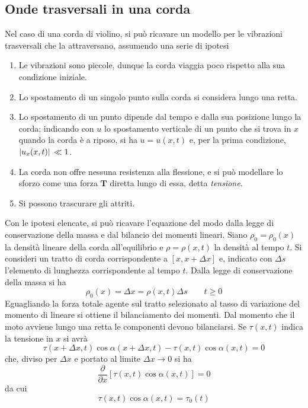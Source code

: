 \documentclass[a4paper,12pt, draft]{article}
\theoremstyle{break}
\numberwithin{equation}{section}
\begin{document}
\subsection{Onde trasversali in una corda}
Nel caso di una corda di violino, si può ricavare un modello per le vibrazioni trasversali che la attraversano, assumendo una serie di ipotesi
\begin{enumerate}
  \item Le vibrazioni sono piccole, dunque la corda viaggia poco rispetto alla sua condizione iniziale.
  \item Lo spostamento di un singolo punto sulla corda si considera lungo una retta.
  \item Lo spostamento di un punto dipende dal tempo e dalla sua posizione lungo la corda; indicando con \(u\) lo spostamento verticale di un punto che si trova in \(x\) quando la corda è a riposo, si ha \(u = u(x,t)\) e, per la prima condizione, \(\abs*{u_x(x,t)} \ll 1\).
  \item La corda non offre nessuna resistenza alla flessione, e si può modellare lo sforzo come una forza \(\bm{T}\) diretta lungo di essa, detta \emph{tensione}.
  \item Si possono trascurare gli attriti.
\end{enumerate}
Con le ipotesi elencate, si può ricavare l'equazione del modo dalla legge di conservazione della massa e dal bilancio dei momenti lineari. Siano \(\rho_0 = \rho_0(x)\) la densità lineare della corda all'equilibrio e \(\rho = \rho(x,t)\) la densità al tempo \(t\). Si consideri un tratto di corda corrispondente a \([x, x+\Delta x]\) e, indicato con \(\Delta s\) l'elemento di lunghezza corrispondente al tempo \(t\). Dalla legge di conservazione della massa si ha 
\begin{equation}
  \rho_0 (x) = \Delta x = \rho(x,t) \Delta s \qquad t \geq 0
\end{equation}
Eguagliando la forza totale agente sul tratto selezionato al tasso di variazione del momento di lineare si ottiene il bilanciamento dei momenti. Dal momento che il moto avviene lungo una retta le componenti devono bilanciarsi. Se \(\tau(x,t)\) indica la tensione in \(x\) si avrà
\[
  \tau(x+\Delta x, t) \cos \alpha (x+\Delta x, t) - \tau(x,t) \cos \alpha (x,t) = 0
\]
che, diviso per \(\Delta x\) e portato al limite \(\Delta x \to 0\) si ha 
\[
  \frac{\partial}{\partial x} [\tau(x,t) \cos \alpha (x,t)] = 0
\]
da cui 
\begin{equation}
  \tau(x,t) \cos \alpha(x,t) = \tau_0(t)
\end{equation}
\end{document}
